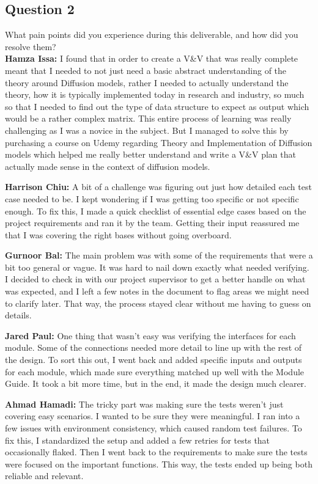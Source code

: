 \documentclass[12pt, titlepage]{article}
\begin{document}
\subsection{Question 2}
What pain points did you experience during this deliverable, and how did you resolve them? \\

\textbf{Hamza Issa:} I found that in order to create a V\&V that was really complete meant that I needed to not just need a basic abstract understanding of the theory around Diffusion models, rather I needed to actually understand the theory, how it is typically implemented today in research and industry, so much so that I needed to find out the type of data structure to expect as output which would be a rather complex matrix. This entire process of learning was really challenging as I was a novice in the subject. But I managed to solve this by purchasing a course on Udemy regarding Theory and Implementation of Diffusion models which helped me really better understand and write a V\&V plan that actually made sense in the context of diffusion models.

\textbf{Harrison Chiu:} A bit of a challenge was figuring out just how detailed each test case needed to be. I kept wondering if I was getting too specific or not specific enough. To fix this, I made a quick checklist of essential edge cases based on the project requirements and ran it by the team. Getting their input reassured me that I was covering the right bases without going overboard.

\textbf{Gurnoor Bal:} The main problem was with some of the requirements that were a bit too general or vague. It was hard to nail down exactly what needed verifying. I decided to check in with our project supervisor to get a better handle on what was expected, and I left a few notes in the document to flag areas we might need to clarify later. That way, the process stayed clear without me having to guess on details.

\textbf{Jared Paul:} One thing that wasn’t easy was verifying the interfaces for each module. Some of the connections needed more detail to line up with the rest of the design. To sort this out, I went back and added specific inputs and outputs for each module, which made sure everything matched up well with the Module Guide. It took a bit more time, but in the end, it made the design much clearer.

\textbf{Ahmad Hamadi:} The tricky part was making sure the tests weren’t just covering easy scenarios. I wanted to be sure they were meaningful. I ran into a few issues with environment consistency, which caused random test failures. To fix this, I standardized the setup and added a few retries for tests that occasionally flaked. Then I went back to the requirements to make sure the tests were focused on the important functions. This way, the tests ended up being both reliable and relevant.
\end{document}
